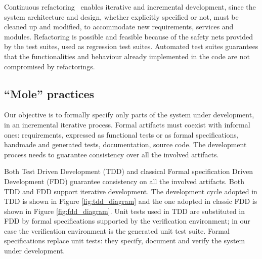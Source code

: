 \documentclass[english]{lni}
\begin{document}
Continuous refactoring~\cite{Fowler1999} enables iterative and incremental development, since the system architecture and design, whether explicitly specified or not, must be cleaned up and modified, to accommodate new requirements, services and modules.
Refactoring is possible and feasible because of the safety nets provided by the test suites, used as regression test suites.
Automated test suites guarantees that the functionalities and behaviour already implemented in the code are not compromised by refactorings.

\subsection{``Mole'' practices}

Our objective is to formally specify only parts of the system under development, in an incremental iterative process.
Formal artifacts must coexist with informal ones: requirements, expressed as functional tests or as formal specifications, handmade and generated tests, documentation, source code.
The development process needs to guarantee consistency over all the involved artifacts.

Both Test Driven Development (TDD) and classical Formal specification Driven Development (FDD) guarantee consistency on all the involved artifacts. 
Both TDD and FDD support iterative development.
The development cycle adopted in TDD is shown in Figure \ref{fig:tdd_diagram} and the one adopted in classic FDD is shown in Figure \ref{fig:fdd_diagram}.
Unit tests used in TDD are substituted  in FDD by formal specifications supported by the verification environment; in our case the verification environment is the generated unit test suite.
Formal specifications replace unit tests: they specify, document and verify the system under development.
\end{document}
